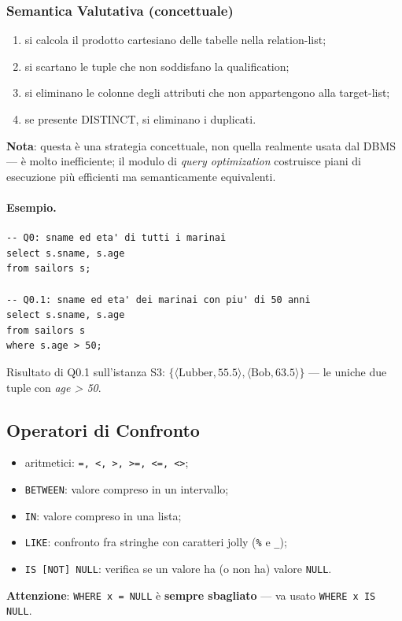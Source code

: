 \documentclass[12pt, a4paper]{article}
\begin{document}
\subsubsection{Semantica Valutativa (concettuale)}

\begin{enumerate}
    \item si calcola il prodotto cartesiano delle tabelle nella relation-list;
    \item si scartano le tuple che non soddisfano la qualification;
    \item si eliminano le colonne degli attributi che non appartengono alla target-list;
    \item se presente DISTINCT, si eliminano i duplicati.
\end{enumerate}
\textbf{Nota}: questa è una strategia concettuale, non quella realmente usata dal DBMS — è molto inefficiente; il modulo di \textit{query optimization} costruisce piani di esecuzione più efficienti ma semanticamente equivalenti.

\paragraph{Esempio.}
\begin{verbatim}
-- Q0: sname ed eta' di tutti i marinai
select s.sname, s.age
from sailors s;

-- Q0.1: sname ed eta' dei marinai con piu' di 50 anni
select s.sname, s.age
from sailors s
where s.age > 50;
\end{verbatim}
Risultato di Q0.1 sull'istanza S3: $\{\langle\text{Lubber},55.5\rangle, \langle\text{Bob},63.5\rangle\}$ — le uniche due tuple con \textit{age > 50}.

\subsection{Operatori di Confronto}

\begin{itemize}
    \item aritmetici: \texttt{=, <, >, >=, <=, <>};
    \item \texttt{BETWEEN}: valore compreso in un intervallo;
    \item \texttt{IN}: valore compreso in una lista;
    \item \texttt{LIKE}: confronto fra stringhe con caratteri jolly (\texttt{\%} e \texttt{\_});
    \item \texttt{IS [NOT] NULL}: verifica se un valore ha (o non ha) valore \texttt{NULL}.
\end{itemize}
\textbf{Attenzione}: \texttt{WHERE x = NULL} è \textbf{sempre sbagliato} — va usato \texttt{WHERE x IS NULL}.
\end{document}
